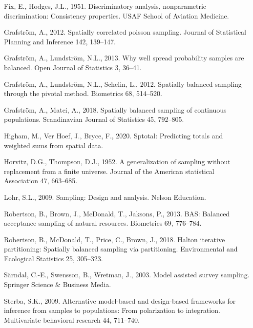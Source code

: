 \documentclass[]{elsarticle} %
\begin{document}
\leavevmode\hypertarget{ref-fix1951discriminatory}{}%
Fix, E., Hodges, J.L., 1951. Discriminatory analysis, nonparametric
discrimination: Consistency properties. USAF School of Aviation
Medicine.

\leavevmode\hypertarget{ref-grafstrom2012spatiallypoisson}{}%
Grafström, A., 2012. Spatially correlated poisson sampling. Journal of
Statistical Planning and Inference 142, 139--147.

\leavevmode\hypertarget{ref-grafstrom2013well}{}%
Grafström, A., Lundström, N.L., 2013. Why well spread probability
samples are balanced. Open Journal of Statistics 3, 36--41.

\leavevmode\hypertarget{ref-grafstrom2012spatially}{}%
Grafström, A., Lundström, N.L., Schelin, L., 2012. Spatially balanced
sampling through the pivotal method. Biometrics 68, 514--520.

\leavevmode\hypertarget{ref-grafstrom2018spatially}{}%
Grafström, A., Matei, A., 2018. Spatially balanced sampling of
continuous populations. Scandinavian Journal of Statistics 45, 792--805.

\leavevmode\hypertarget{ref-higham2020sptotal}{}%
Higham, M., Ver Hoef, J., Bryce, F., 2020. Sptotal: Predicting totals
and weighted sums from spatial data.

\leavevmode\hypertarget{ref-horvitz1952generalization}{}%
Horvitz, D.G., Thompson, D.J., 1952. A generalization of sampling
without replacement from a finite universe. Journal of the American
statistical Association 47, 663--685.

\leavevmode\hypertarget{ref-lohr2009sampling}{}%
Lohr, S.L., 2009. Sampling: Design and analysis. Nelson Education.

\leavevmode\hypertarget{ref-robertson2013bas}{}%
Robertson, B., Brown, J., McDonald, T., Jaksons, P., 2013. BAS: Balanced
acceptance sampling of natural resources. Biometrics 69, 776--784.

\leavevmode\hypertarget{ref-robertson2018halton}{}%
Robertson, B., McDonald, T., Price, C., Brown, J., 2018. Halton
iterative partitioning: Spatially balanced sampling via partitioning.
Environmental and Ecological Statistics 25, 305--323.

\leavevmode\hypertarget{ref-sarndal2003model}{}%
Särndal, C.-E., Swensson, B., Wretman, J., 2003. Model assisted survey
sampling. Springer Science \& Business Media.

\leavevmode\hypertarget{ref-sterba2009alternative}{}%
Sterba, S.K., 2009. Alternative model-based and design-based frameworks
for inference from samples to populations: From polarization to
integration. Multivariate behavioral research 44, 711--740.
\end{document}
